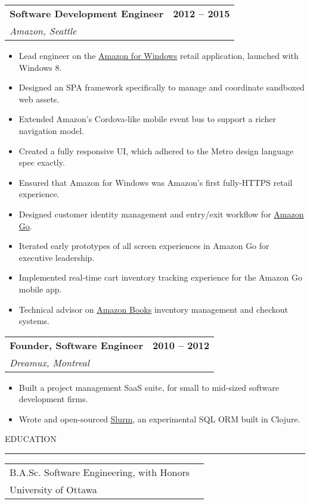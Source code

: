 \documentclass[12pt]{article}
\makeatletter
\newenvironment{justifycolumns}
{\begin{tabular*}{\textwidth}{@{\extracolsep{\fill}}lr@{}}}
{\end{tabular*}}
\newcommand{\row}[2]{#1 & #2 \\}
\newcommand{\rowheading}[2]{\row{\textbf{#1}}{\textbf{#2}}}
\newcommand{\range}[2]{#1 -- #2}
\newcommand{\blockseparation}{\vspace{0.13in}}
\newcommand{\heading}[1]{
	\vspace{0.05in}
	\uppercase{#1}
	\vspace{0.05in}
	\hrule
	\blockseparation
}
\newenvironment{tightbullets}
{\begin{itemize}}
{\end{itemize}}
\newenvironment{bullets}
{\begin{tightbullets}}
{\end{tightbullets} \blockseparation}
\makeatother
\begin{document}
\begin{flushleft}
\begin{justifycolumns}
	\rowheading{Software Development Engineer}{\range{2012}{2015}}
	\row{\emph{Amazon, Seattle}}{}
\end{justifycolumns}
\begin{bullets}
	\item Lead engineer on the \href{http://apps.microsoft.com/windows/en-us/app/amazon/80299018-3dee-418d-8466-374fe9463309}{Amazon for Windows} retail application, launched with Windows 8.
	\item Designed an SPA framework specifically to manage and coordinate sandboxed web assets.
	\item Extended Amazon’s Cordova-like mobile event bus to support a richer navigation model.
	\item Created a fully responsive UI, which adhered to the Metro design language spec exactly.
	\item Ensured that Amazon for Windows was Amazon's first fully-HTTPS retail experience.
	\item Designed customer identity management and entry/exit workflow for \href{https://www.amazon.com/b?ie=UTF8\&node=16008589011}{Amazon Go}.
	\item Iterated early prototypes of all screen experiences in Amazon Go for executive leadership.
	\item Implemented real-time cart inventory tracking experience for the Amazon Go mobile app.
	\item Technical advisor on \href{https://www.amazon.com/amazon-books-university-village-seattle-washington/b?ie=UTF8\&node=17750359011}{Amazon Books} inventory management and checkout systems.
\end{bullets}
\vspace{0.05in}

\begin{justifycolumns}
	\rowheading{Founder, Software Engineer}{\range{2010}{2012}}
	\row{\emph{Dreamux, Montreal}}{}
\end{justifycolumns}
\begin{bullets}
	\item Built a project management SaaS suite, for small to mid-sized software development firms.
	\item Wrote and open-sourced \href{https://github.com/amcnamara/slurm}{Slurm}, an experimental SQL ORM built in Clojure.
\end{bullets}

\blockseparation

\heading{Education}
\begin{justifycolumns}
	\row{B.A.Sc. Software Engineering, with Honors}{}
	\row{University of Ottawa}{}
\end{justifycolumns}


\end{flushleft}
\end{document}
